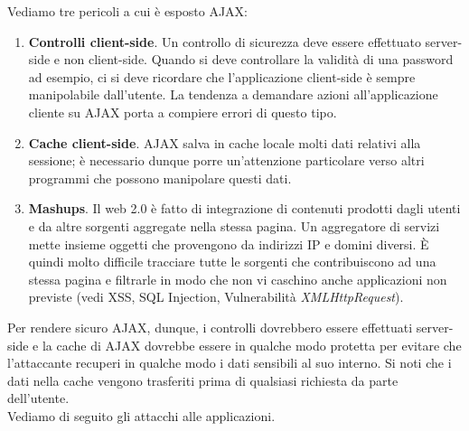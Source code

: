 Vediamo tre pericoli a cui è esposto AJAX:
\begin{enumerate}
	\item \textbf{Controlli client-side}. Un controllo di sicurezza deve essere effettuato server-side e non client-side. Quando si deve controllare la validità di una password ad esempio, ci si deve ricordare che l'applicazione client-side è sempre manipolabile dall'utente. La tendenza a demandare azioni all'applicazione cliente su AJAX porta a compiere errori di questo tipo.
	\item \textbf{Cache client-side}. AJAX salva in cache locale molti dati relativi alla sessione; è necessario dunque porre un'attenzione particolare verso altri programmi che possono manipolare questi dati.
	\item \textbf{Mashups}. Il web 2.0 è fatto di integrazione di contenuti prodotti dagli utenti e da altre sorgenti aggregate nella stessa pagina. Un aggregatore di servizi mette insieme oggetti che provengono da indirizzi IP e domini diversi. È quindi molto difficile tracciare tutte le sorgenti che contribuiscono ad una stessa pagina e filtrarle in modo che non vi caschino anche applicazioni non previste (vedi XSS, SQL Injection, Vulnerabilità \textit{XMLHttpRequest}).
\end{enumerate}
Per rendere sicuro AJAX, dunque, i controlli dovrebbero essere effettuati server-side e la cache di AJAX dovrebbe essere in qualche modo protetta per evitare che l'attaccante recuperi in qualche modo i dati sensibili al suo interno. Si noti che i dati nella cache vengono trasferiti prima di qualsiasi richiesta da parte dell'utente.\\

\noindent Vediamo di seguito gli attacchi alle applicazioni.

